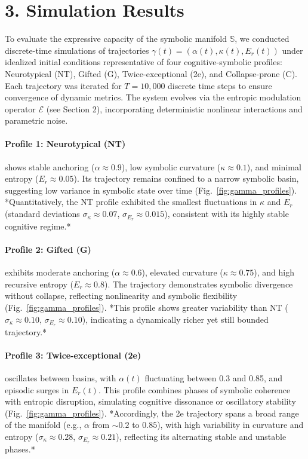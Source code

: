 \section*{3. Simulation Results}

To evaluate the expressive capacity of the symbolic manifold $\mathbb{S}$, we conducted discrete-time simulations of trajectories $\gamma(t) = (\alpha(t), \kappa(t), E_r(t))$ under idealized initial conditions representative of four cognitive-symbolic profiles: Neurotypical (NT), Gifted (G), Twice-exceptional (2e), and Collapse-prone (C). Each trajectory was iterated for $T=10{,}000$ discrete time steps to ensure convergence of dynamic metrics. The system evolves via the entropic modulation operator $\mathcal{E}$ (see Section 2), incorporating deterministic nonlinear interactions and parametric noise.

\paragraph{Profile 1: Neurotypical (NT)} shows stable anchoring ($\alpha \approx 0.9$), low symbolic curvature ($\kappa \approx 0.1$), and minimal entropy ($E_r \approx 0.05$). Its trajectory remains confined to a narrow symbolic basin, suggesting low variance in symbolic state over time (Fig.~\ref{fig:gamma_profiles}). *Quantitatively, the NT profile exhibited the smallest fluctuations in $\kappa$ and $E_r$ (standard deviations $\sigma_{\kappa}\approx0.07$, $\sigma_{E_r}\approx0.015$), consistent with its highly stable cognitive regime.* 

\paragraph{Profile 2: Gifted (G)} exhibits moderate anchoring ($\alpha \approx 0.6$), elevated curvature ($\kappa \approx 0.75$), and high recursive entropy ($E_r \approx 0.8$). The trajectory demonstrates symbolic divergence without collapse, reflecting nonlinearity and symbolic flexibility (Fig.~\ref{fig:gamma_profiles}). *This profile shows greater variability than NT ($\sigma_{\kappa}\approx0.10$, $\sigma_{E_r}\approx0.10$), indicating a dynamically richer yet still bounded trajectory.* 

\paragraph{Profile 3: Twice-exceptional (2e)} oscillates between basins, with $\alpha(t)$ fluctuating between 0.3 and 0.85, and episodic surges in $E_r(t)$. This profile combines phases of symbolic coherence with entropic disruption, simulating cognitive dissonance or oscillatory stability (Fig.~\ref{fig:gamma_profiles}). *Accordingly, the 2e trajectory spans a broad range of the manifold (e.g., $\alpha$ from $\sim0.2$ to $0.85$), with high variability in curvature and entropy ($\sigma_{\kappa}\approx0.28$, $\sigma_{E_r}\approx0.21$), reflecting its alternating stable and unstable phases.* 

